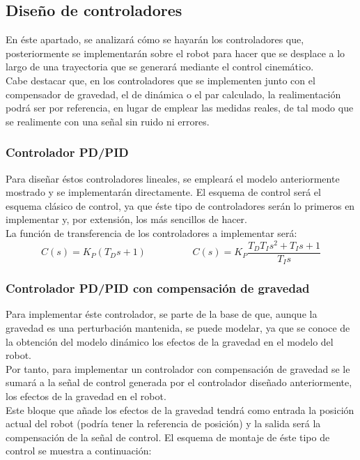 	\subsection{Diseño de controladores}
	En éste apartado, se analizará cómo se hayarán los controladores que, posteriormente se implementarán sobre el robot para hacer que se desplace a lo largo de una trayectoria que se generará mediante el control cinemático.\\
	Cabe destacar que, en los controladores que se implementen junto con el compensador de gravedad, el de dinámica o el par calculado, la realimentación podrá ser por referencia, en lugar de emplear las medidas reales, de tal modo que se realimente con una señal sin ruido ni errores.\\
	\subsubsection{Controlador PD/PID}
	Para diseñar éstos controladores lineales, se empleará el modelo anteriormente mostrado y se implementarán directamente. El esquema de control será el esquema clásico de control, ya que éste tipo de controladores serán lo primeros en implementar y, por extensión, los más sencillos de hacer. \\
	La función de transferencia de los controladores a implementar será:\\
	\begin{equation}
		C(s)=K_{P}(T_{D}s+1) \hspace{2cm} C(s)=K_{P}\frac{T_{D}T_{I}s^{2}+T_{I}s+1}{T_{I}s}
	\end{equation}

	\subsubsection{Controlador PD/PID con compensación de gravedad}
	Para implementar éste controlador, se parte de la base de que, aunque la gravedad es una perturbación mantenida, se puede
modelar, ya que se conoce de la obtención del modelo dinámico los efectos de la gravedad en el modelo del robot.\\
Por tanto, para implementar un controlador con compensación de gravedad se le sumará a la señal de control generada por el
controlador diseñado anteriormente, los efectos de la gravedad en el robot.\\
Este bloque que añade los efectos de la gravedad tendrá como entrada la posición actual del robot (podría tener la referencia de posición) y la salida será la compensación de la señal de control. El esquema de montaje de éste tipo de control se muestra a continuación:

